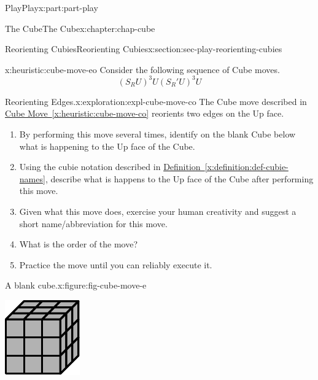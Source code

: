 \documentclass[oneside,10pt,]{book}
\newcommand{\xreffont}{\relax}
\numberwithin{equation}{section}
\begin{document}
\begin{partptx}{Play}{}{Play}{}{}{x:part:part-play}
\begin{chapterptx}{The Cube}{}{The Cube}{}{}{x:chapter:chap-cube}
\begin{sectionptx}{Reorienting Cubies}{}{Reorienting Cubies}{}{}{x:section:sec-play-reorienting-cubies}
\begin{heuristic}{}{}{x:heuristic:cube-move-eo}%
%
Consider the following sequence of Cube moves.%
%
\begin{equation*}
(S_R U)^3 U (S_R ' U)^3 U
\end{equation*}
\end{heuristic}
\begin{exploration}{Reorienting Edges.}{x:exploration:expl-cube-move-co}%
The Cube move described in \hyperref[x:heuristic:cube-move-co]{Cube Move~{\xreffont\ref{x:heuristic:cube-move-co}}} reorients two edges on the Up face.%
%
\begin{enumerate}
\item{}By performing this move several times, identify on the blank Cube below what is happening to the Up face of the Cube.%
\item{}Using the cubie notation described in \hyperref[x:definition:def-cubie-names]{Definition~{\xreffont\ref{x:definition:def-cubie-names}}}, describe what is happens to the Up face of the Cube after performing this move.%
\item{}Given what this move does, exercise your human creativity and suggest a short name\slash{}abbreviation for this move.%
\item{}What is the order of the move?%
\item{}Practice the move until you can reliably execute it.%
\end{enumerate}
\begin{figureptx}{A blank cube.}{x:figure:fig-cube-move-e}{}%
\begin{image}{0.25}{0.5}{0.25}%
\includegraphics[width=\linewidth]{./images/grey_cube.pdf}

\end{image}
\end{figureptx}
\end{exploration}
\end{sectionptx}
\end{chapterptx}
\end{partptx}
\end{document}
